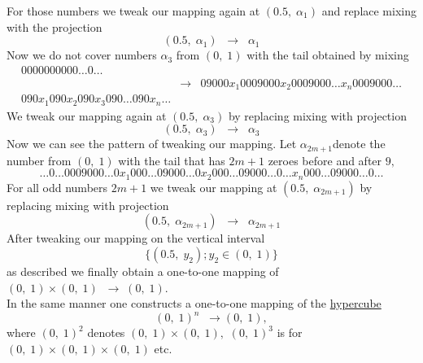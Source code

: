 \documentclass[color=black,11pt]{elegantpaper}
\begin{document}
For those numbers we tweak our mapping again at $(0.5,\;\alpha_{1})$ and replace mixing with the projection
$$
(0.5,\;\alpha_{1}) \;\; \rightarrow \;\; \alpha_{1}
$$
Now we do not cover numbers $\alpha_{3}$  from $(0,\;1)$ with the tail obtained by mixing
\begin{eqnarray*}
0000000000{\dots}0{\dots}&&\\
 &\rightarrow &  09000x_{1}0009000x_{2}0009000{\dots}x_{n}0009000{\dots}\\
 090x_{1}090x_{2}090x_{3}090{\dots}090x_{n}{\dots} &&
\end{eqnarray*}
We tweak our mapping again at $ (0.5,\;\alpha_{3})$ by replacing mixing with projection
$$
(0.5,\;\alpha_{3}) \;\; \rightarrow \;\; \alpha_{3}
$$
Now we can see the pattern of tweaking our mapping. Let $\alpha_{2m+1}$denote the number from $(0,\;1)$ with the tail that has $2m+1$ zeroes before and after $9,$
$$
{\dots}0{\dots}0009000{\dots}0x_{1}000{\dots}09000{\dots}0x_{2}000{\dots}09000{\dots}0{\dots}x_{n}000{\dots}09000{\dots}0{\dots}
$$
For all odd numbers $2m+1$ we tweak our mapping at $(0.5,\;\alpha_{2m+1})$ by replacing mixing with projection
$$
(0.5,\;\alpha_{2m+1}) \;\;\rightarrow \;\; \alpha_{2m+1}
$$
After tweaking our mapping on the vertical interval
$$
 \{(0.5,\; y_{2}); y_{2} \in (0,\;1)\}
$$
as described we finally obtain a one-to-one mapping of $ (0,\;1)\times (0,\;1) \;\;\rightarrow \; (0,\;1).$\\
In the same manner one constructs a one-to-one mapping of the \href{https://en.wikipedia.org/wiki/Hypercube}{hypercube} 
$$
(0,\;1)^n \;\;\rightarrow (0,\;1),
$$ 
where $(0,\;1)^2$ denotes $(0,\;1)\times (0,\;1),$  $(0,\;1)^3$ is for $(0,\;1)\times (0,\;1)\times (0,\;1)$ etc.





\end{document}
